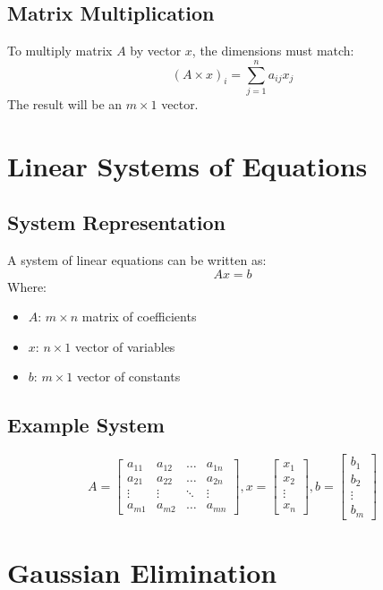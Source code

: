 \documentclass{article}
\begin{document}
\subsection{Matrix Multiplication}
To multiply matrix $A$ by vector $x$, the dimensions must match:
\[
(A \times x)_i = \sum_{j=1}^{n} a_{ij} x_j
\]
The result will be an $m \times 1$ vector.

\section{Linear Systems of Equations}

\subsection{System Representation}
A system of linear equations can be written as:
\[
A x = b
\]
Where:
\begin{itemize}
    \item $A$: $m \times n$ matrix of coefficients
    \item $x$: $n \times 1$ vector of variables
    \item $b$: $m \times 1$ vector of constants
\end{itemize}

\subsection{Example System}
\[
A = \begin{bmatrix}
a_{11} & a_{12} & \dots & a_{1n} \\
a_{21} & a_{22} & \dots & a_{2n} \\
\vdots & \vdots & \ddots & \vdots \\
a_{m1} & a_{m2} & \dots & a_{mn}
\end{bmatrix}
,
x = \begin{bmatrix}
x_1 \\
x_2 \\
\vdots \\
x_n
\end{bmatrix}
,
b = \begin{bmatrix}
b_1 \\
b_2 \\
\vdots \\
b_m
\end{bmatrix}
\]

\section{Gaussian Elimination}
\end{document}
